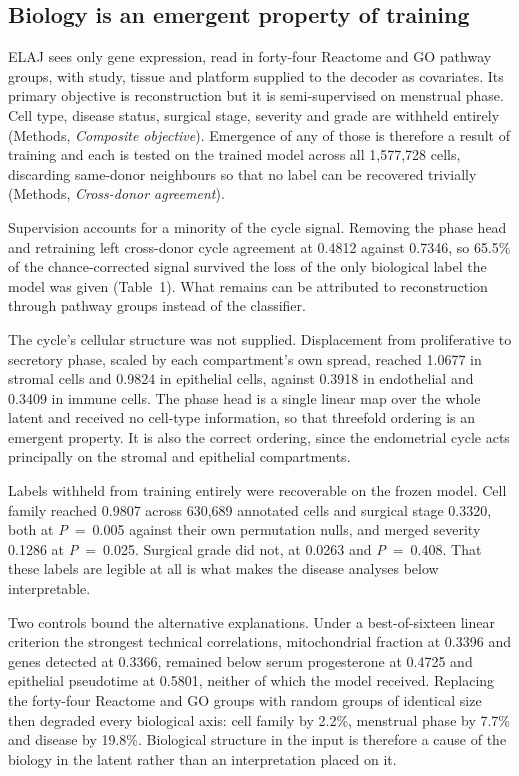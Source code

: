\documentclass[11pt]{article}
\newcommand{\elaj}{ELAJ\xspace}
\begin{document}
\subsection*{Biology is an emergent property of training}

\elaj{} sees only gene expression, read in forty-four Reactome and GO
pathway groups, with study, tissue and platform supplied to the decoder as
covariates. Its primary objective is reconstruction but it is 
semi-supervised on menstrual phase. Cell type, disease status, surgical stage, 
severity and grade are withheld entirely (Methods, \emph{Composite objective}). 
Emergence of any of those is therefore a result of training and each is tested on
the trained model across all 1,577,728 cells, discarding same-donor
neighbours so that no label can be recovered trivially (Methods, 
\emph{Cross-donor agreement}).

Supervision accounts for a minority of the cycle signal. Removing the phase
head and retraining left cross-donor cycle agreement at 0.4812 against
0.7346, so 65.5\% of the chance-corrected signal survived the loss of the
only biological label the model was given (Table~1). What remains can be 
attributed to reconstruction through pathway groups instead of the classifier.

The cycle's cellular structure was not supplied. Displacement from
proliferative to secretory phase, scaled by each compartment's own spread,
reached 1.0677 in stromal cells and 0.9824 in epithelial cells, against
0.3918 in endothelial and 0.3409 in immune cells. The phase head is a single
linear map over the whole latent and received no cell-type information, so
that threefold ordering is an emergent property. It is also the
correct ordering, since the endometrial cycle acts principally on the
stromal and epithelial compartments.

Labels withheld from training entirely were recoverable on the frozen model.
Cell family reached 0.9807 across 630,689 annotated cells and surgical
stage 0.3320, both at \textit{P}~=~0.005 against their own permutation nulls, and
merged severity 0.1286 at \textit{P}~=~0.025. Surgical grade did not, at 0.0263 and \textit{P}~=~0.408. That 
these labels are legible at all is what makes the disease analyses below 
interpretable.

Two controls bound the alternative explanations. Under a best-of-sixteen
linear criterion the strongest technical correlations, mitochondrial fraction
at 0.3396 and genes detected at 0.3366, remained below serum progesterone at
0.4725 and epithelial pseudotime at 0.5801, neither of which the model
received. Replacing the forty-four Reactome and GO groups with random groups of
identical size then degraded every biological axis: cell family by 2.2\%,
menstrual phase by 7.7\% and disease by 19.8\%. Biological structure in the
input is therefore a cause of the biology in the latent rather than an
interpretation placed on it.
\end{document}
